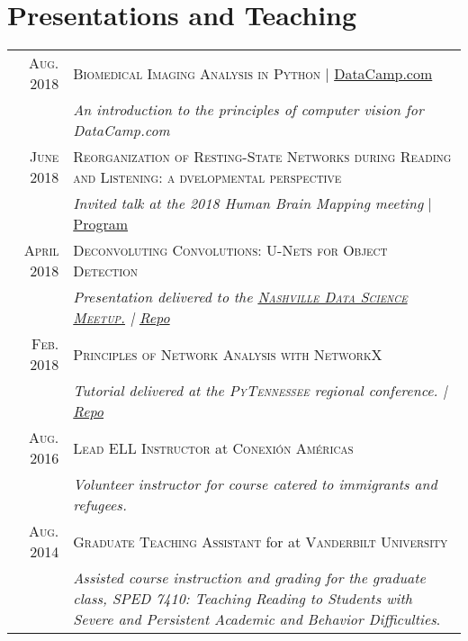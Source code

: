 \documentclass[a4paper,11pt]{article}
\begin{document}
\section{Presentations and Teaching}
\begin{longtable}{rp{11cm}}
    \textsc{Aug.} 2018 & \textsc{Biomedical Imaging Analysis in Python} | \href{https://www.datacamp.com/courses/biomedical-image-analysis-in-python}{DataCamp.com} \\
    & \small{\emph{An introduction to the principles of computer vision for DataCamp.com}} \smallskip \\

    \textsc{June} 2018 & \textsc{Reorganization of Resting-State Networks during Reading and Listening: a dvelopmental perspective} \\
    & \small{\emph{Invited talk at the 2018 Human Brain Mapping meeting} | \href{https://ww5.aievolution.com/hbm1801/index.cfm?do=ev.viewEv&ev=1362}{Program}} \smallskip \\

    \textsc{April} 2018 & \textsc{Deconvoluting Convolutions: U-Nets for Object Detection}\\
    & \small{\emph{Presentation delivered to the \href{https://www.meetup.com/Data-Science-Nashville/events/249853957/}{\textsc{Nashville Data Science Meetup}.} | \href{https://github.com/stkbailey/deconv-conv)}{Repo}}} \smallskip \\

    \textsc{Feb.} 2018 & \textsc{Principles of Network Analysis with NetworkX}\\
    & \small{\emph{Tutorial delivered at the \textsc{PyTennessee} regional conference. | \href{https://github.com/stkbailey/nashnetx/presentations}{Repo}}}  \smallskip\\

    \textsc{Aug. 2016} & \textsc{Lead ELL Instructor} at \textsc{Conexi\'on Am\'ericas} \\
    & \small{\emph{Volunteer instructor for course catered to immigrants and refugees.}} \\ 
    
    \textsc{Aug. 2014} & \textsc{Graduate Teaching Assistant} for at \textsc{Vanderbilt University} \\
    & \small{\emph{Assisted course instruction and grading for the graduate class, \textit{SPED 7410: Teaching Reading to Students with Severe and Persistent Academic and Behavior Difficulties}}.} \\ 
    
\end{longtable}
\end{document}
